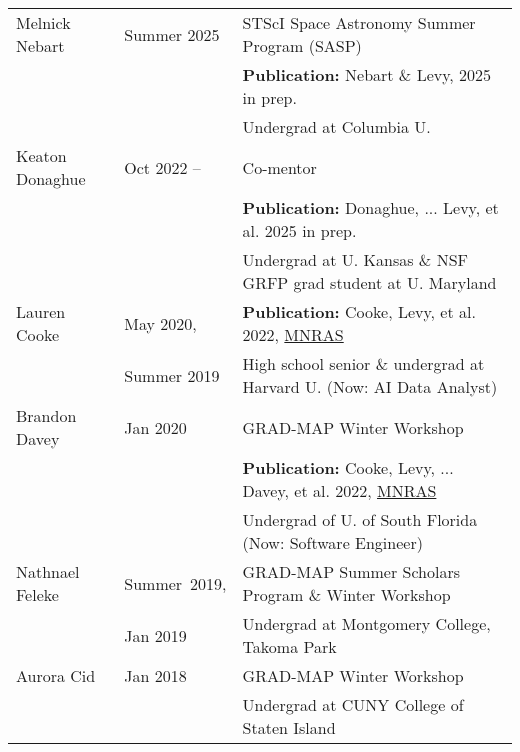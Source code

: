\documentclass[11pt]{article}
\begin{document}
\begin{longtable}{p{}p{}p{}}

Melnick Nebart & Summer 2025 & STScI Space Astronomy Summer Program (SASP) \\
&& {\bf Publication:} Nebart \& Levy, 2025 in prep.\\
& & {\small Undergrad at Columbia U.}\medskip\\

Keaton Donaghue  & Oct 2022 -- & Co-mentor\\ 
 && {\bf Publication:} Donaghue, ... Levy, et al. 2025 in prep.\\ 
 & & {\small Undergrad at U. Kansas  \& NSF GRFP grad student at U. Maryland}\medskip\\

Lauren Cooke& May 2020,&{\bf Publication:} Cooke, Levy, et al. 2022, \href{https://ui.adsabs.harvard.edu/abs/2022MNRAS.512.1012C/abstract}{MNRAS} \\
&  Summer 2019  & {\small High school senior \& undergrad at Harvard U. (Now: AI Data Analyst)}\medskip\\

 Brandon Davey& Jan 2020  & GRAD-MAP Winter Workshop\\
& & {\bf Publication:} Cooke, Levy, ... Davey, et al. 2022, \href{https://ui.adsabs.harvard.edu/abs/2022MNRAS.512.1012C/abstract}{MNRAS}\\
 & & {\small Undergrad of U. of South Florida (Now: Software Engineer)}\medskip\\

 Nathnael Feleke & \mbox{Summer 2019,} & GRAD-MAP Summer Scholars Program \& Winter Workshop\\
 & Jan 2019& {\small Undergrad at Montgomery College, Takoma Park}\medskip\\

Aurora Cid & Jan 2018 &  GRAD-MAP Winter Workshop \\
 & &{\small Undergrad at CUNY College of Staten Island} \medskip\\


\end{longtable}
\end{document}
